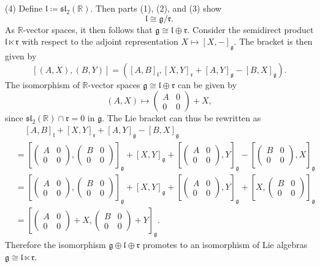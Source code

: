 \documentclass[11pt, letterpaper]{article}
\theoremstyle{plain}
\begin{document}
(4) Define $\mathfrak{l} \coloneqq \mathfrak{sl} _2(\mathbb{R} )$. Then parts (1), (2), and (3) show
\[
	\mathfrak{l} \cong \mathfrak{g} /\mathfrak{r} 
.\]
As $\mathbb{R} $-vector spaces, it then follows that $\mathfrak{g} \cong \mathfrak{l} \oplus \mathfrak{r} $. Consider the semidirect product $\mathfrak{l} \ltimes \mathfrak{r} $ with respect to the adjoint representation $X\mapsto [X,-]_\mathfrak{g} $. The bracket is then given by
\[
	\left[ (A,X),(B,Y) \right] = \left( \left[ A,B \right]_\mathfrak{l} ,\left[ X,Y \right]_{\mathfrak{r}} +[A,Y]_\mathfrak{g} -[B,X]_\mathfrak{g}  \right) 
.\]
The isomorphism of $\mathbb{R} $-vector spaces $\mathfrak{g} \cong \mathfrak{l} \oplus \mathfrak{r} $ can be given by
\[
	(A,X)\mapsto \begin{pmatrix}
	A & 0 \\
	0 & 0
	\end{pmatrix}+X,
\]
since $\mathfrak{sl} _2(\mathbb{R} ) \cap \mathfrak{r} =0$ in $\mathfrak{g} $. The Lie bracket can thus be rewritten as
\begin{align*}
	&\;\;\;\;[A,B]_\mathfrak{l} +[X,Y]_\mathfrak{r} +[A,Y]_\mathfrak{g} -[B,X]_\mathfrak{g} \\
	&=\left[ \begin{pmatrix}
	A & 0 \\
	0 & 0
	\end{pmatrix},\begin{pmatrix}
	B & 0 \\
	0 & 0
\end{pmatrix} \right]_\mathfrak{g} +[X,Y]_\mathfrak{g} +\left[ \begin{pmatrix}
A & 0 \\
0 & 0
\end{pmatrix},Y \right] _\mathfrak{g} -\left[ \begin{pmatrix}
B & 0 \\
0 & 0
\end{pmatrix},X \right] _\mathfrak{g} \\
	&=\left[ \begin{pmatrix}
	A & 0 \\
	0 & 0
	\end{pmatrix},\begin{pmatrix}
	B & 0 \\
	0 & 0
\end{pmatrix} \right]_\mathfrak{g} +[X,Y]_\mathfrak{g} +\left[ \begin{pmatrix}
A & 0 \\
0 & 0
\end{pmatrix},Y \right] _\mathfrak{g} +\left[ X,\begin{pmatrix}
B & 0 \\
0 & 0
\end{pmatrix} \right] _\mathfrak{g} \\
	&=\left[ \begin{pmatrix}
	A & 0 \\
	0 & 0
	\end{pmatrix}+X,\begin{pmatrix}
	B & 0 \\
	0 & 0
	\end{pmatrix}+Y \right]_\mathfrak{g} 
.\end{align*}
Therefore the isomorphism $\mathfrak{g} \oplus \mathfrak{l} \oplus \mathfrak{r} $ promotes to an isomorphism of Lie algebras $\mathfrak{g} \cong \mathfrak{l} \ltimes \mathfrak{r} $.
\end{document}
